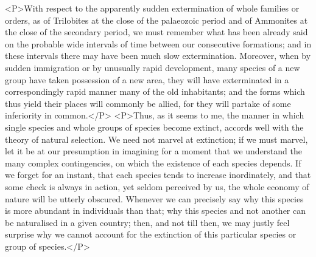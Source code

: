 <P>With respect to the apparently sudden extermination of whole families or orders, as of Trilobites at the close of the palaeozoic period and of Ammonites at the close of the secondary period, we must remember what has been already said on the probable wide intervals of time between our consecutive formations; and in these intervals there may have been much slow extermination. Moreover, when by sudden immigration or by unusually rapid development, many species of a new group have taken possession of a new area, they will have exterminated in a correspondingly rapid manner many of the old inhabitants; and the forms which thus yield their places will commonly be allied, for they will partake of some inferiority in common.</P>
<P>Thus, as it seems to me, the manner in which single species and whole groups of species become extinct, accords well with the theory of natural selection. We need not marvel at extinction; if we must marvel, let it be at our presumption in imagining for a moment that we understand the many complex contingencies, on which the existence of each species depends. If we forget for an instant, that each species tends to increase inordinately, and that some check is always in action, yet seldom perceived by us, the whole economy of nature will be utterly obscured. Whenever we can precisely say why this species is more abundant in individuals than that; why this species and not another can be naturalised in a given country; then, and not till then, we may justly feel surprise why we cannot account for the extinction of this particular species or group of species.</P>

